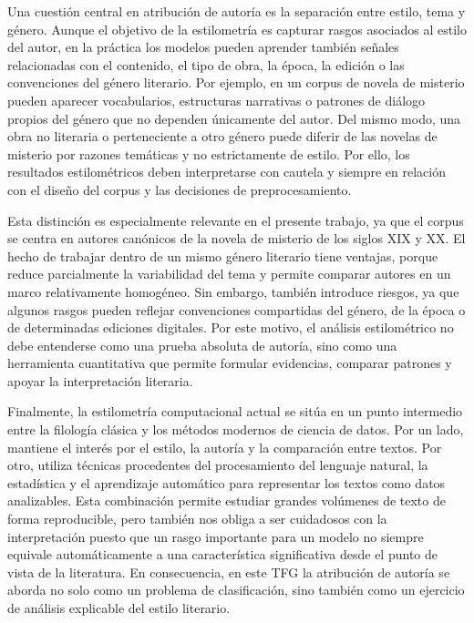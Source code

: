 \documentclass[IB]{TFUOC}%
\begin{document}
Una cuestión central en atribución de autoría es la separación entre estilo, tema y género. Aunque el objetivo de la estilometría es capturar rasgos asociados al estilo del autor, en la práctica los modelos pueden aprender también señales relacionadas con el contenido, el tipo de obra, la época, la edición o las convenciones del género literario. Por ejemplo, en un corpus de novela de misterio pueden aparecer vocabularios, estructuras narrativas o patrones de diálogo propios del género que no dependen únicamente del autor. Del mismo modo, una obra no literaria o perteneciente a otro género puede diferir de las novelas de misterio por razones temáticas y no estrictamente de estilo. Por ello, los resultados estilométricos deben interpretarse con cautela y siempre en relación con el diseño del corpus y las decisiones de preprocesamiento.

Esta distinción es especialmente relevante en el presente trabajo, ya que el corpus se centra en autores canónicos de la novela de misterio de los siglos XIX y XX. El hecho de trabajar dentro de un mismo género literario tiene ventajas, porque reduce parcialmente la variabilidad del tema y permite comparar autores en un marco relativamente homogéneo. Sin embargo, también introduce riesgos, ya que algunos rasgos pueden reflejar convenciones compartidas del género, de la época o de determinadas ediciones digitales. Por este motivo, el análisis estilométrico no debe entenderse como una prueba absoluta de autoría, sino como una herramienta cuantitativa que permite formular evidencias, comparar patrones y apoyar la interpretación literaria.

Finalmente, la estilometría computacional actual se sitúa en un punto intermedio entre la filología clásica y los métodos modernos de ciencia de datos. Por un lado, mantiene el interés por el estilo, la autoría y la comparación entre textos. Por otro, utiliza técnicas procedentes del procesamiento del lenguaje natural, la estadística y el aprendizaje automático para representar los textos como datos analizables. Esta combinación permite estudiar grandes volúmenes de texto de forma reproducible, pero también nos obliga a ser cuidadosos con la interpretación puesto que un rasgo importante para un modelo no siempre equivale automáticamente a una característica significativa desde el punto de vista de la literatura. En consecuencia, en este TFG la atribución de autoría se aborda no solo como un problema de clasificación, sino también como un ejercicio de análisis explicable del estilo literario.
\end{document}
